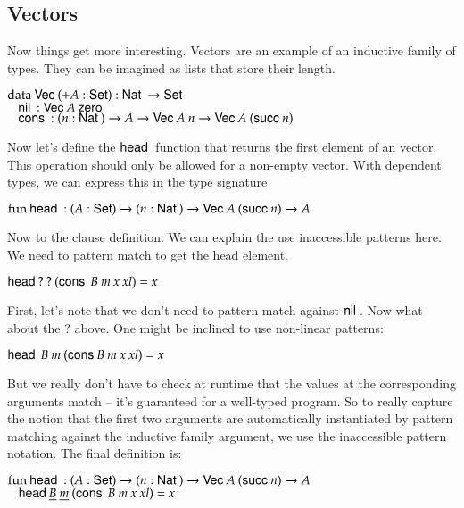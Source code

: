 \subsection{Vectors}
Now things get more interesting. Vectors are an example of an inductive family of types.
They can be imagined as lists that store their length.
\begin{bsp}
$\mathrm{data}\: \mathsf{Vec}\: ( + A : \mathsf{Set} ) : \mathsf{Nat}\: \rightarrow \mathsf{Set} $ \\
$\hspace*{3mm} \mathsf{nil}\: : \mathsf{Vec}\: A \: \mathsf{zero}\:  $\\
$ \hspace*{3mm} \mathsf{cons}\: : ( n : \mathsf{Nat}\: ) \rightarrow{ A \rightarrow\mathsf{Vec}\:A \: n \rightarrow\mathsf{Vec}\:A \: (\mathsf{succ}\:n)} $
\end{bsp}
Now let's define the $\mathsf{head}\:$ function that returns the first element of an vector. This operation should only be allowed for a non-empty vector.
With dependent types, we can express this in the type signature
\begin{bsp}
$ \mathrm{fun}\: \mathsf{head}\: : ( A : \mathsf{Set} ) \rightarrow ( n : \mathsf{Nat}\: ) \rightarrow \mathsf{Vec}\: A \: (\mathsf{succ}\: n) \rightarrow A $
\end{bsp}
Now to the clause definition. We can explain the use inaccessible patterns here.
We need to pattern match to get the head element.
\begin{bsp}
$\mathsf{head}\: ? \: ? \: (\mathsf{cons}\: \: B \: m \: x \: xl) = x $
\end{bsp}
First, let's note that we don't need to pattern match against $\mathsf{nil}\:$.
Now what about the ? above. 
One might be inclined to use non-linear patterns:
\begin{bsp}
$\mathsf{head}\: \: B \: m \: (\mathsf{cons}\:  B \: m \: x \: xl) = x $
\end{bsp}
But we really don't have to check at runtime that the values at the corresponding arguments match -- it's guaranteed for a well-typed program.
So to really capture the notion that the first two arguments are automatically instantiated by pattern matching against the inductive family argument, we use the inaccessible pattern notation. The final definition is:
\begin{bsp}
$ \mathrm{fun}\: \mathsf{head}\: : ( A : \mathsf{Set} ) \rightarrow ( n : \mathsf{Nat}\: ) \rightarrow \mathsf{Vec}\: A \: (\mathsf{succ}\: n) \rightarrow A $\\
$ \hspace*{3mm} \mathsf{head}\: \underline{B} \: \underline{m} \: (\mathsf{cons}\: \: B \: m \: x \: xl) = x $
\end{bsp}
